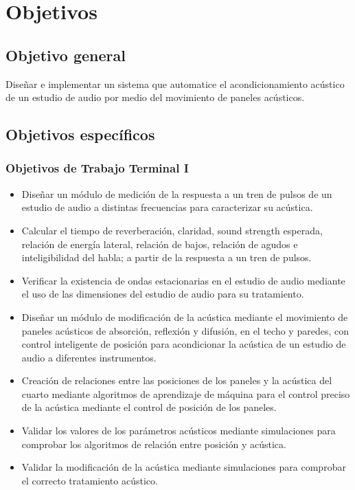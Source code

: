 \section*{Objetivos}

\subsection*{Objetivo general}

Diseñar e implementar un sistema que automatice el acondicionamiento acústico de un estudio de audio por medio del movimiento de paneles acústicos.
\subsection*{Objetivos específicos}

\subsubsection*{Objetivos de Trabajo Terminal I}
\begin{itemize}
    \item Diseñar un módulo de medición de la respuesta a un tren de pulsos de un estudio de audio a distintas frecuencias para caracterizar su acústica.
    \item Calcular el tiempo de reverberación, claridad, sound strength esperada, relación de energía lateral, relación de bajos, relación de agudos e inteligibilidad del habla; a partir de la respuesta a un tren de pulsos.
    \item Verificar la existencia de ondas estacionarias en el estudio de audio mediante el uso de las dimensiones del estudio de audio para su tratamiento. 
    \item Diseñar un módulo de modificación de la acústica mediante el movimiento de paneles acústicos de absorción, reflexión y difusión, en el techo y paredes, con control inteligente de posición para acondicionar la acústica de un estudio de audio a diferentes instrumentos.
    \item Creación de relaciones entre las posiciones de los paneles y la acústica del cuarto mediante algoritmos de aprendizaje de máquina para el control preciso de la acústica mediante el control de posición de los paneles.
    \item Validar los valores de los parámetros acústicos mediante simulaciones para comprobar los algoritmos de relación entre posición y acústica.
    \item Validar la modificación de la acústica mediante simulaciones para comprobar el correcto tratamiento acústico.
\end{itemize}

